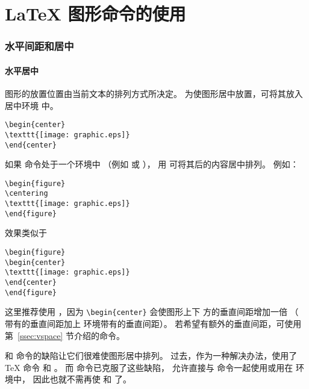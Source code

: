 
\part{\LaTeX{} 图形命令的使用}

\section{水平间距和居中}\label{sec:center}

\subsection{水平居中}\label{ssec:hcenter}
图形的放置位置由当前文本的排列方式所决定。
为使图形居中放置，可将其放入居中环境  中。
\begin{lstlisting}
\begin{center}
\texttt{[image: graphic.eps]}
\end{center}
\end{lstlisting}

如果  命令处于一个环境中
（例如  或 ），
用  可将其后的内容居中排列。
例如：

\begin{lstlisting}
\begin{figure}
\centering
\texttt{[image: graphic.eps]}
\end{figure}
\end{lstlisting}
效果类似于
\begin{lstlisting}
\begin{figure}
\begin{center}
\texttt{[image: graphic.eps]}
\end{center}
\end{figure}
\end{lstlisting}
这里推荐使用 ，因为 \verb+\begin{center}+ 会使图形上下
方的垂直间距增加一倍
（  带有的垂直间距加上  环境带有的垂直间距）。
若希望有额外的垂直间距，可使用第~\ref{ssec:vspace} 节介绍的命令。

 和  命令的缺陷让它们很难使图形居中排列。
过去，作为一种解决办法，使用了 \TeX{} 命令  和 。
而  命令已克服了这些缺陷，
允许直接与  命令一起使用或用在  环境中，
因此也就不需再使  和 了。


